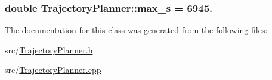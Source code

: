 \subsubsection[{\texorpdfstring{max\+\_\+s}{max_s}}]{\setlength{\rightskip}{0pt plus 5cm}double Trajectory\+Planner\+::max\+\_\+s = 6945.\hspace{0.3cm}{\ttfamily [protected]}}\hypertarget{classTrajectoryPlanner_ae0aef5ddc2586b021db0200812fcf72d}{}\label{classTrajectoryPlanner_ae0aef5ddc2586b021db0200812fcf72d}


The documentation for this class was generated from the following files\+:\begin{DoxyCompactItemize}
\item 
src/\hyperlink{TrajectoryPlanner_8h}{Trajectory\+Planner.\+h}\item 
src/\hyperlink{TrajectoryPlanner_8cpp}{Trajectory\+Planner.\+cpp}\end{DoxyCompactItemize}
